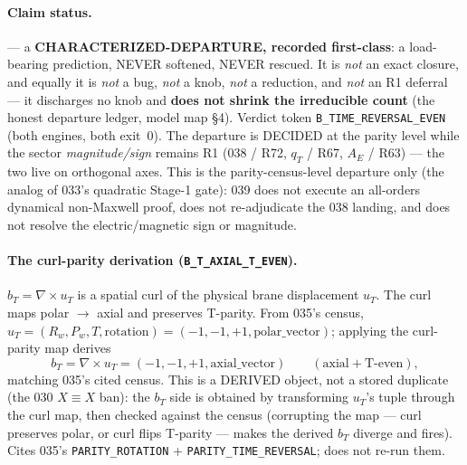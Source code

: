 \paragraph{Claim status.}
\StatusOpen{} --- a \textbf{CHARACTERIZED-DEPARTURE, recorded first-class}: a
load-bearing prediction, NEVER softened, NEVER rescued. It is \emph{not} an exact
closure, and equally it is \emph{not} a bug, \emph{not} a knob, \emph{not} a
reduction, and \emph{not} an R1 deferral --- it discharges no knob and \textbf{does
not shrink the irreducible count} (the honest departure ledger, model map \S4).
Verdict token \texttt{B\_TIME\_REVERSAL\_EVEN} (both engines, both exit~0). The
departure is DECIDED at the parity level while the sector \emph{magnitude/sign}
remains R1 (038 / R72, \(q_T\) / R67, \(A_E\) / R63) --- the two live on orthogonal
axes. This is the parity-census-level departure only (the analog of 033's quadratic
Stage-1 gate): 039 does not execute an all-orders dynamical non-Maxwell proof, does
not re-adjudicate the 038 landing, and does not resolve the electric/magnetic sign or
magnitude.

\paragraph{The curl-parity derivation (\texttt{B\_T\_AXIAL\_T\_EVEN}).}
\(b_T=\nabla\times u_T\) is a spatial curl of the physical brane displacement
\(u_T\). The curl maps polar \(\to\) axial and preserves T-parity. From 035's census,
\(u_T=(R_w,P_w,T,\text{rotation})=(-1,-1,+1,\text{polar\_vector})\); applying the
curl-parity map derives
\[
  b_T=\nabla\times u_T=(-1,-1,+1,\text{axial\_vector})\qquad(\text{axial}+\text{T-even}),
\]
matching 035's cited census. This is a DERIVED object, not a stored duplicate (the
030 \(X\equiv X\) ban): the \(b_T\) side is obtained by transforming \(u_T\)'s tuple
through the curl map, then checked against the census (corrupting the map ---
curl preserves polar, or curl flips T-parity --- makes the derived \(b_T\) diverge
and fires). Cites 035's \texttt{PARITY\_ROTATION} + \texttt{PARITY\_TIME\_REVERSAL};
does not re-run them.

